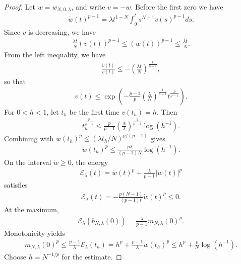 \documentclass[11pt]{amsart}
\theoremstyle{definition}
\begin{document}
\begin{proof}
    Let $w=w_{N,0,\lambda}$, and write $v=-w$.  Before the first zero we have
    \begin{align*}
        \dot{w}(t)^{p-1}=\lambda t^{1-N}\int_0^ts^{N-1}v(s)^{p-1}ds.
    \end{align*}
    Since $v$ is decreasing, we have
    \begin{align*}
        \frac{\lambda t}{N}(v(t))^{p-1}\leq (\dot{w}(t))^{p-1}\leq \frac{\lambda t}{N}.
    \end{align*}
    From the left inequality, we have
    \begin{align*}
        \frac{\dot{v}(t)}{v(t)}\leq-\left(\frac{\lambda t}{N}\right)^{\frac{1}{p-1}},
    \end{align*}
    so that
    \begin{align*}
        v(t)\leq \exp\left(-\frac{p-1}{p}\left(\frac{\lambda}{N}\right)^{\frac{1}{p-1}}t^{\frac{p}{p-1}}\right).
    \end{align*}
    For $0<h<1$, let $t_h$ be the first time $v(t_h)=h$.  Then
    \begin{align*}
        t_h^{\frac{p}{p-1}}\leq\frac{p}{p-1}\left(\frac{N}{\lambda}\right)^{\frac{1}{p-1}}\log(h^{-1}).
    \end{align*}
    Combining with $\dot{w}(t_h)^p\leq (\lambda t_h/N)^{p/(p-1)}$ gives
    \begin{align*}
        \dot{w}(t_h)^p\leq \frac{p\lambda}{(p-1)N}\log(h^{-1}).
    \end{align*}
On the interval $\dot{w}\geq 0$, the energy
\begin{align*}
    \mathcal{E}_\lambda(t)=\dot{w}(t)^p+\frac{\lambda}{p-1}|w(t)|^p
\end{align*}
satisfies 
\begin{align*}
    \dot{\mathcal{E}}_\lambda(t)=-\frac{p(N-1)}{(p-1)t}\dot{w}(t)^p\leq 0.
\end{align*}
    At the maximum,
    \begin{align*}
        \mathcal{E}_\lambda(b_{N,\lambda}(0))=\frac{\lambda}{p-1}m_{N,\lambda}(0)^p.
    \end{align*}
    Monotonicity yields
    \begin{align*}
        m_{N,\lambda}(0)^p\leq \frac{p-1}{\lambda}\mathcal{E}_\lambda(t_h)=h^p+\frac{p-1}{\lambda}\dot{w}(t_h)^p\leq h^p+\frac{p}{N}\log(h^{-1}).
    \end{align*}
    Choose $h=N^{-1/p}$ for the estimate. 
\end{proof}
\end{document}
